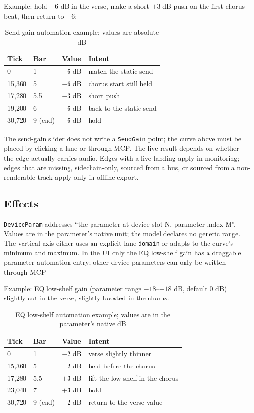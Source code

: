 Example: hold $-6$ dB in the verse, make a short $+3$ dB push on the first chorus beat, then return to $-6$:

\begin{table}[htbp]
\centering
\small
\begin{tabular}{@{}llll@{}}
\hline
Tick & Bar & Value & Intent \\
\hline
0 & 1 & $-6$ dB & match the static send \\
15{,}360 & 5 & $-6$ dB & chorus start still held \\
17{,}280 & 5.5 & $-3$ dB & short push \\
19{,}200 & 6 & $-6$ dB & back to the static send \\
30{,}720 & 9 (end) & $-6$ dB & hold \\
\hline
\end{tabular}
\caption{Send-gain automation example; values are absolute dB}
\label{tab:automation-send-recipe}
\end{table}

The send-gain slider does not write a \texttt{SendGain} point; the curve above must be placed by clicking a lane or through MCP. The live result depends on whether the edge actually carries audio. Edges with a live landing apply in monitoring; edges that are missing, sidechain-only, sourced from a bus, or sourced from a non-renderable track apply only in offline export.

\subsection{Effects}

\texttt{DeviceParam} addresses ``the parameter at device slot N, parameter index M''. Values are in the parameter's native unit; the model declares no generic range. The vertical axis either uses an explicit lane \texttt{domain} or adapts to the curve's minimum and maximum. In the UI only the EQ low-shelf gain has a draggable parameter-automation entry; other device parameters can only be written through MCP.

Example: EQ low-shelf gain (parameter range $-18$--$+18$ dB, default 0 dB) slightly cut in the verse, slightly boosted in the chorus:

\begin{table}[htbp]
\centering
\small
\begin{tabular}{@{}llll@{}}
\hline
Tick & Bar & Value & Intent \\
\hline
0 & 1 & $-2$ dB & verse slightly thinner \\
15{,}360 & 5 & $-2$ dB & held before the chorus \\
17{,}280 & 5.5 & $+3$ dB & lift the low shelf in the chorus \\
23{,}040 & 7 & $+3$ dB & hold \\
30{,}720 & 9 (end) & $-2$ dB & return to the verse value \\
\hline
\end{tabular}
\caption{EQ low-shelf automation example; values are in the parameter's native dB}
\label{tab:automation-device-recipe}
\end{table}

